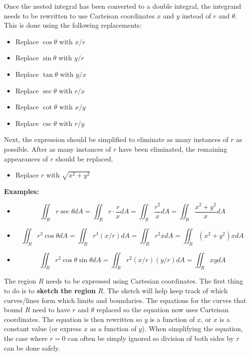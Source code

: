 \documentclass{article}
\begin{document}
Once the nested integral has been converted to a double integral, the integrand needs to be rewritten to use Carteisan coordinates \(x\) and \(y\) instead of \(r\) and \(\theta\). This is done using the following replacements:
\begin{itemize}
\item Replace \(\cos\theta\) with \(x/r\)
\item Replace \(\sin\theta\) with \(y/r\)
\item Replace \(\tan\theta\) with \(y/x\)
\item Replace \(\sec\theta\) with \(r/x\)
\item Replace \(\cot\theta\) with \(x/y\)
\item Replace \(\csc\theta\) with \(r/y\)
\end{itemize}
Next, the expression should be simplified to eliminate as many instances of \(r\) as possible. After as many instances of \(r\) have been eliminated, the remaining appearances of \(r\) should be replaced.
\begin{itemize}
\item Replace \(r\) with \(\sqrt{x^2 + y^2}\) 
\end{itemize} 
\textbf{Examples:}
\begin{itemize}
\item
\[\iint_R r\sec\theta dA = \iint_R r \cdot \frac{r}{x} dA = \iint_R \frac{r^2}{x} dA = \iint_R \frac{x^2 + y^2}{x} dA\]
\item
\[\iint_R r^3\cos\theta dA = \iint_R r^3(x/r)dA = \iint_R r^2 x dA = \iint_R (x^2 + y^2) x dA\]
\item
\[\iint_R r^2\cos\theta\sin\theta dA = \iint_R r^2(x/r)(y/r)dA = \iint_R xy dA\]
\end{itemize}
The region \(R\) needs to be expressed using Cartesian coordinates. The first thing to do is to {\bf sketch the region} \(R\). The sketch will help keep track of which curves/lines form which limits and boundaries. The equations for the curves that bound \(R\) need to have \(r\) and \(\theta\) replaced so the equation now uses Carteisan coordinates. The equation is then rewritten so \(y\) is a function of \(x\), or \(x\) is a constant value (or express \(x\) as a function of \(y\)). When simplifying the equation, the case where \(r = 0\) can often be simply ignored so division of both sides by \(r\) can be done safely.
\end{document}
